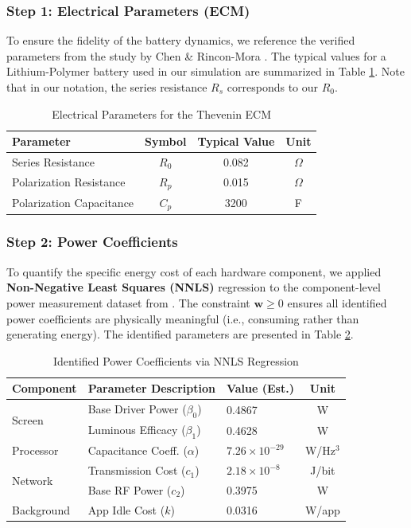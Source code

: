 \documentclass{mcmthesis}
\begin{document}
\subsubsection{Step 1: Electrical Parameters (ECM)}
To ensure the fidelity of the battery dynamics, we reference the verified parameters from the study by Chen \& Rincon-Mora \cite{chen2006}. The typical values for a Lithium-Polymer battery used in our simulation are summarized in Table \ref{tab:ecm_params}. Note that in our notation, the series resistance $R_s$ corresponds to our $R_0$.

\begin{table}[H]
\centering
\caption{Electrical Parameters for the Thevenin ECM \cite{chen2006}}
\label{tab:ecm_params}
\begin{tabular}{lccc}
\toprule
\textbf{Parameter} & \textbf{Symbol} & \textbf{Typical Value} & \textbf{Unit} \\ 
\midrule
Series Resistance & $R_0$ & 0.082 & $\Omega$ \\
Polarization Resistance & $R_p$ & 0.015 & $\Omega$ \\
Polarization Capacitance & $C_p$ & 3200 & F \\
\bottomrule
\end{tabular}
\end{table}

\subsubsection{Step 2: Power Coefficients}
To quantify the specific energy cost of each hardware component, we applied \textbf{Non-Negative Least Squares (NNLS)} regression to the component-level power measurement dataset from \cite{power_unpacked}. The constraint $\mathbf{w} \ge 0$ ensures all identified power coefficients are physically meaningful (i.e., consuming rather than generating energy). The identified parameters are presented in Table \ref{tab:power_coeffs}.

\begin{table}[H]
\centering
\caption{Identified Power Coefficients via NNLS Regression \cite{power_unpacked}}
\label{tab:power_coeffs}
\begin{tabularx}{\textwidth}{lXlc}
\toprule
\textbf{Component} & \textbf{Parameter Description} & \textbf{Value (Est.)} & \textbf{Unit} \\ 
\midrule
\multirow{2}{*}{Screen} & Base Driver Power ($\beta_0$) & 0.4867 & W \\
 & Luminous Efficacy ($\beta_1$) & 0.4628 & W \\
\midrule
Processor & Capacitance Coeff. ($\alpha$) & $7.26 \times 10^{-29}$ & W/Hz$^3$ \\
\midrule
\multirow{2}{*}{Network} & Transmission Cost ($c_1$) & $2.18 \times 10^{-8}$ & J/bit \\
 & Base RF Power ($c_2$) & 0.3975 & W \\
\midrule
Background & App Idle Cost ($k$) & 0.0316 & W/app \\
\bottomrule
\end{tabularx}
\end{table}
\end{document}
